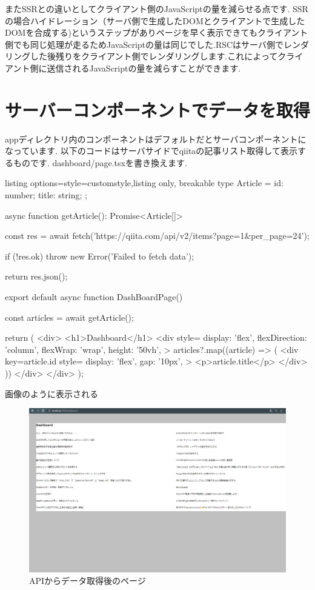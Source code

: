 またSSRとの違いとしてクライアント側のJavaScriptの量を減らせる点です.
SSRの場合ハイドレーション（サーバ側で生成したDOMとクライアントで生成したDOMを合成する)というステップがありページを早く表示できてもクライアント側でも同じ処理が走るためJavaScriptの量は同じでした.RSCはサーバ側でレンダリングした後残りをクライアント側でレンダリングします.これによってクライアント側に送信されるJavaScriptの量を減らすことができます.


\section{サーバーコンポーネントでデータを取得}


appディレクトリ内のコンポーネントはデフォルトだとサーバコンポーネントになっています.
以下のコードはサーバサイドでqiitaの記事リスト取得して表示するものです.
dashboard/page.tsxを書き換えます.



\begin{tcblisting}{listing options={style=customstyle},listing only, breakable}
  type Article = {
  id: number;
  title: string;
  };

  async function getArticle(): Promise<Article[]> {
  const res = await fetch('https://qiita.com/api/v2/items?page=1&per_page=24');

  if (!res.ok) {
      throw new Error('Failed to fetch data');
    }

  return res.json();
  }

  export default async function DashBoardPage() {
  const articles = await getArticle();

  return (
  <div>
  <h1>Dashboard</h1>
  <div
  style={{
      display: 'flex',
      flexDirection: 'column',
      flexWrap: 'wrap',
      height: '50vh',
    }}
  >
  {articles?.map((article) => (
  <div
  key={article.id}
  style={{
      display: 'flex',
      gap: '10px',
    }}
  >
    <p>{article.title}</p>
  </div>
  ))}
  </div>
  </div>
  );
  }


\end{tcblisting}






画像のように表示される

\begin{figure}[H]
  \centering
  \includegraphics[width=12cm]{./image/03-Tech/chap4/06.png}
  \caption{APIからデータ取得後のページ}
\end{figure}


